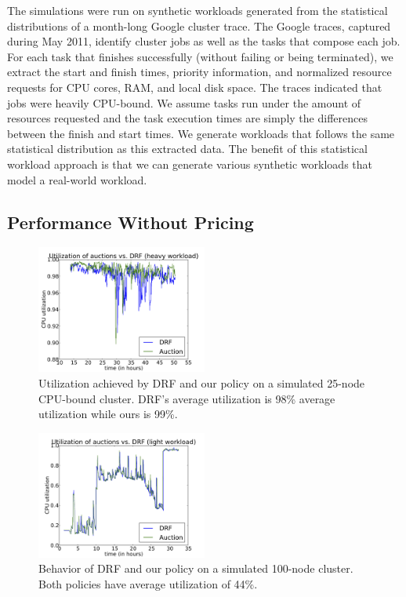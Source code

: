 \documentclass{acm_proc_article-sp}
\begin{document}
The simulations were run on synthetic workloads generated from the statistical distributions of a month-long Google cluster trace. The Google traces, captured during May 2011, identify cluster jobs as well as the tasks that compose each job. For each task that finishes successfully (without failing or being terminated), we extract the start and finish times, priority information, and normalized resource requests for CPU cores, RAM, and local disk space. The traces indicated that jobs were heavily CPU-bound. We assume tasks run under the amount of resources requested and the task execution times are simply the differences between the finish and start times. We generate workloads that follows the same statistical distribution as this extracted data. The benefit of this statistical workload approach is that we can generate various synthetic workloads that model a real-world workload.

\subsection{Performance Without Pricing\\}

\begin{figure}
\includegraphics[width=0.5\textwidth]{images/util_high.png}
\caption{Utilization achieved by DRF and our policy on a simulated 25-node CPU-bound cluster.  DRF's average utilization is 98\% average utilization while ours is 99\%.}
\label{img:util_high}
\end{figure}

\begin{figure}

\includegraphics[width=0.5\textwidth]{images/util_low.png}
\caption{Behavior of DRF and our policy on a simulated 100-node cluster. Both policies have average utilization of 44\%.}
\label{img:util_low}
\end{figure}
\end{document}
